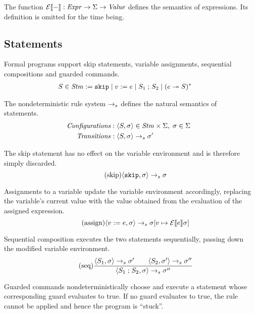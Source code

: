 \documentclass{article}
\begin{document}
The function $\mathcal{E} \llbracket - \rrbracket : \mathit{Expr} \rightarrow \Sigma \rightarrow \mathit{Value}$ defines the semantics of
expressions.
Its definition is omitted for the time being.

\subsection{Statements}

Formal programs support skip statements, variable assignments, sequential compositions and guarded commands.
\begin{align*}
	S \in \mathit{Stm} & :=
		\mathtt{skip} \mid 
		v\; \mathtt{:=}\; e \mid 
		S_1 \; \mathtt{;} \; S_2 \mid
		(e \; \mathtt{\twoheadrightarrow} \; S)^*
\end{align*}

The nondeterministic rule system $\rightarrow_s$ defines the natural semantics of statements.
\begin{align*}
	\mathit{Configurations} : & \;\langle S, \sigma \rangle \in \mathit{Stm} \times \Sigma, \; \sigma \in \Sigma
	\\
	\mathit{Transitions} : & \;\langle S, \sigma \rangle \rightarrow_s \sigma'
\end{align*}

The skip statement has no effect on the variable environment and is therefore simply discarded.
\begin{equation*}
	\tag{skip}
	\langle \mathtt{skip}, \sigma \rangle
		\rightarrow_s
	\sigma
\end{equation*}

Assignments to a variable update the variable environment accordingly, replacing the variable's current value with the value
obtained from the evaluation of the assigned expression.
\begin{equation*}
	\tag{assign}
	\langle v\; \mathtt{:=}\; e, \sigma \rangle
		\rightarrow_s
	\sigma[v \mapsto \mathcal{E} \llbracket e \rrbracket \sigma]
\end{equation*}

Sequential composition executes the two statements sequentially, passing down the modified variable environment.
\begin{equation*}
	\tag{seq}
	\dfrac
	{
		\langle S_1, \sigma \rangle
			\rightarrow_s
		\sigma'
		\qquad
		\langle S_2, \sigma' \rangle
			\rightarrow_s
		\sigma''
	}
	{
		\langle S_1 \; \mathtt{;} \; S_2, \sigma \rangle
			\rightarrow_s
		\sigma''
	}
\end{equation*}

Guarded commands nondeterministically choose and execute a statement whose corresponding guard evaluates to true. If no guard
evaluates to true, the rule cannot be applied and hence the program is ``stuck''.
\end{document}

